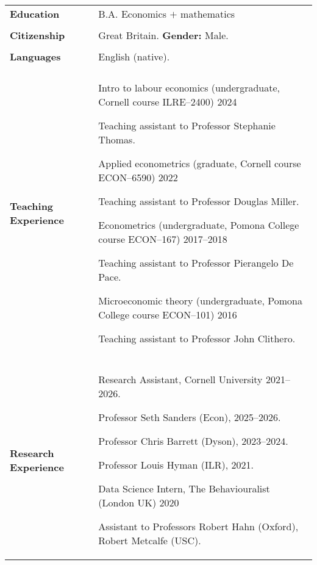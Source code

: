 \documentclass[letterpaper,11pt,oneside]{article}
\begin{document}
\begin{longtable}[\textwidth]{p{} p{}}
\textbf{Education}
    & B.A. Economics $+$ mathematics  \\ \\

\textbf{Citizenship}
    & Great Britain.%
    \hfill \textbf{Gender:} Male. \\ \\

\textbf{Languages}
    & English (native). \\ \\
        
\textbf{Teaching Experience}
    & Intro to labour economics (undergraduate, Cornell course ILRE--2400) \hfill 2024

    \indent\hspace{1cm} Teaching assistant to Professor Stephanie Thomas.

    Applied econometrics (graduate, Cornell course ECON--6590) \hfill 2022 
    
    \indent\hspace{1cm} Teaching assistant to Professor Douglas Miller.
    
    Econometrics (undergraduate, Pomona College course ECON--167) \hfill 2017--2018
    
    \indent\hspace{1cm} Teaching assistant to Professor Pierangelo De Pace.

    Microeconomic theory (undergraduate, Pomona College course ECON--101) \hfill 2016

    \indent\hspace{1cm} Teaching assistant to Professor John Clithero. \\ \\

\textbf{Research Experience}
    & Research Assistant, Cornell University \hfill 2021--2026.

    \indent\hspace{1cm} Professor Seth Sanders (Econ), 2025--2026.

    \indent\hspace{1cm} Professor Chris Barrett (Dyson), 2023--2024.

    \indent\hspace{1cm} Professor Louis Hyman (ILR), 2021.

    Data Science Intern, The Behaviouralist (London UK) \hfill 2020

    \indent\hspace{1cm} Assistant to Professors  Robert Hahn (Oxford), Robert Metcalfe (USC).


\end{longtable}
\end{document}

